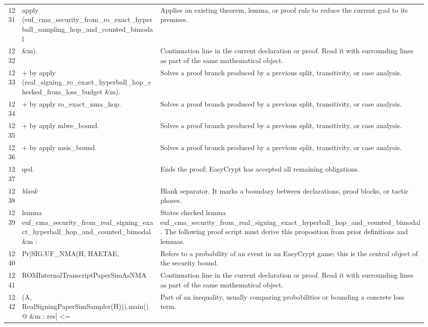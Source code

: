 \documentclass[10pt]{article}
\begin{document}
\begin{longtable}{r L{0.53\textwidth} L{0.37\textwidth}}
1231 & {\ttfamily\scriptsize apply (euf\_cma\_security\_from\_ro\_exact\_hyperball\_sampling\_hop\_and\_counted\_bimodal} & Applies an existing theorem, lemma, or proof rule to reduce the current goal to its premises. \\
1232 & {\ttfamily\scriptsize          \&m).} & Continuation line in the current declaration or proof.  Read it with surrounding lines as part of the same mathematical object. \\
1233 & {\ttfamily\scriptsize + by apply (real\_signing\_ro\_exact\_hyperball\_hop\_checked\_from\_loss\_budget \&m).} & Solves a proof branch produced by a previous split, transitivity, or case analysis. \\
1234 & {\ttfamily\scriptsize + by apply ro\_exact\_nma\_hop.} & Solves a proof branch produced by a previous split, transitivity, or case analysis. \\
1235 & {\ttfamily\scriptsize + by apply mlwe\_bound.} & Solves a proof branch produced by a previous split, transitivity, or case analysis. \\
1236 & {\ttfamily\scriptsize + by apply msis\_bound.} & Solves a proof branch produced by a previous split, transitivity, or case analysis. \\
1237 & {\ttfamily\scriptsize qed.} & Ends the proof; EasyCrypt has accepted all remaining obligations. \\
1238 & {\ttfamily\scriptsize \emph{blank}} & Blank separator.  It marks a boundary between declarations, proof blocks, or tactic phases. \\
1239 & {\ttfamily\scriptsize lemma euf\_cma\_security\_from\_real\_signing\_exact\_hyperball\_hop\_and\_counted\_bimodal \&m :} & States checked lemma euf\_cma\_security\_from\_real\_signing\_exact\_hyperball\_hop\_and\_counted\_bimodal.  The following proof script must derive this proposition from prior definitions and lemmas. \\
1240 & {\ttfamily\scriptsize   Pr[SIG.UF\_NMA(H, HAETAE,} & Refers to a probability of an event in an EasyCrypt game; this is the central object of the security bound. \\
1241 & {\ttfamily\scriptsize        ROMInternalTranscriptPaperSimAsNMA} & Continuation line in the current declaration or proof.  Read it with surrounding lines as part of the same mathematical object. \\
1242 & {\ttfamily\scriptsize          (A, RealSigningPaperSimSampler(H))).main() @ \&m : res] <=} & Part of an inequality, usually comparing probabilities or bounding a concrete loss term. \\

\end{longtable}
\end{document}
